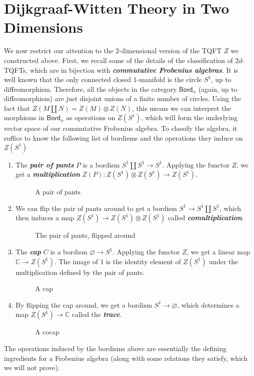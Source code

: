 \documentclass[psamsfonts, 11pt]{amsart}
\newcommand{\incfig}[2]{%
    \fontsize{48pt}{50pt}\selectfont
    \def\svgwidth{\columnwidth}
    \scalebox{#2}{}
}
\theoremstyle{definition}
\theoremstyle{remark}
\newcommand{\Bord}{\mathsf{Bord}}
\renewcommand{\emptyset}{\varnothing}
\newcommand{\ib}[1]{\textbf{\textit{#1}}}
\newcommand{\C}{\mathbb{C}}
\begin{document}
\section{Dijkgraaf-Witten Theory in Two Dimensions}
%
We now restrict our attention to the $2$-dimensional version of the TQFT $Z$
we constructed above. First, we recall some of the details of the classification of
$2d$-TQFTs, which are in bijection with \ib{commutative Frobenius algebras}. It is well
known that the only connected closed $1$-manifold is the circle $S^1$, up to
diffeomorphism. Therefore, all the objects in the category $\Bord_n$ (again, up to
diffeomorphism) are just disjoint unions of a finite number of circles. Using the fact
that $Z(M \coprod N) = Z(M) \otimes Z(N)$, this means we can interpret the morphisms
in $\Bord_n$ as operations on $Z(S^1)$, which will form the underlying vector space
of our commutative Frobenius algebra. To classify the algebra, it suffice to know the
following list of bordisms and the operations they induce on $Z(S^1)$
\begin{enumerate}
  \item The \ib{pair of pants} $P$ is a bordism $S^1 \coprod S^1 \to S^1$. Applying
  the functor $Z$, we get a \ib{multiplication}
  $Z(P) : Z(S^1) \otimes Z(S^1) \to Z(S^1)$.
  \begin{figure}[ht]
      \centering
      \incfig{pair_of_pants}{0.15}
      \caption{A pair of pants}
  \end{figure}
  \item We can flip the pair of pants around to get a bordism $S^1 \to S^1 \coprod S^1$,
  which then induces a map $Z(S^1) \to Z(S^1) \otimes Z(S^1)$ called
  \ib{comultiplication}.
  \begin{figure}[ht]
      \centering
      \incfig{flipped_pair_of_pants}{0.15}
      \caption{The pair of pants, flipped around}
  \end{figure}
  \item The \ib{cap} $C$ is a bordism $\emptyset \to S^1$. Applying the functor $Z$,
  we get a linear map $\C \to Z(S^1)$. The image of $1$ is the identity element of
  $Z(S^1)$ under the multiplication defined by the pair of pants.
  \begin{figure}[ht]
      \centering
      \incfig{cocap}{0.15}
      \caption{A cap}
  \end{figure}
  \item By flipping the cap around, we get a bordism $S^1 \to \emptyset$, which
  determines a map $Z(S^1) \to \C$ called the \ib{trace}.
  \begin{figure}[ht]
      \centering
      \incfig{cap}{0.15}
      \caption{A cocap}
  \end{figure}
\end{enumerate}
%
The operations induced by the bordisms above are essentially the defining ingredients
for a Frobenius algebra (along with some relations they satisfy, which we will
not prove). \\
\end{document}

